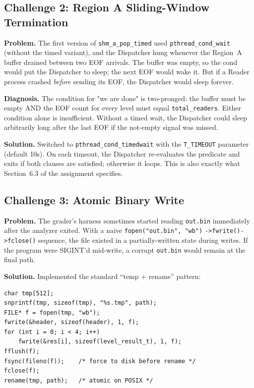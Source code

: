 \documentclass[11pt,a4paper]{article}
\newcommand{\code}[1]{\texttt{\small #1}}
\begin{document}
\subsection{Challenge 2: Region A Sliding-Window Termination}

\textbf{Problem.} The first version of \code{shm\_a\_pop\_timed} used
\code{pthread\_cond\_wait} (without the timed variant), and the
Dispatcher hung whenever the Region~A buffer drained between two EOF
arrivals. The buffer was empty, so the cond would put the Dispatcher to
sleep; the next EOF would wake it. But if a Reader process crashed
\emph{before} sending its EOF, the Dispatcher would sleep forever.

\textbf{Diagnosis.} The condition for "we are done" is two-pronged:
the buffer must be empty AND the EOF count for every level must equal
\code{total\_readers}. Either condition alone is insufficient. Without
a timed wait, the Dispatcher could sleep arbitrarily long after the
last EOF if the not-empty signal was missed.

\textbf{Solution.} Switched to \code{pthread\_cond\_timedwait} with the
\code{T\_TIMEOUT} parameter (default 10s). On each timeout, the
Dispatcher re-evaluates the predicate and exits if both clauses are
satisfied; otherwise it loops. This is also exactly what Section~6.3
of the assignment specifies.

\subsection{Challenge 3: Atomic Binary Write}

\textbf{Problem.} The grader's harness sometimes started reading
\code{out.bin} immediately after the analyzer exited. With a naive
\code{fopen("out.bin", "wb")} \code{->fwrite()->fclose()} sequence, the
file existed in a partially-written state during writes. If the
program were SIGINT'd mid-write, a corrupt \code{out.bin} would remain
at the final path.

\textbf{Solution.} Implemented the standard ``temp + rename'' pattern:

\begin{lstlisting}[style=Cstyle]
char tmp[512];
snprintf(tmp, sizeof(tmp), "%s.tmp", path);
FILE* f = fopen(tmp, "wb");
fwrite(&header, sizeof(header), 1, f);
for (int i = 0; i < 4; i++)
    fwrite(&res[i], sizeof(level_result_t), 1, f);
fflush(f);
fsync(fileno(f));    /* force to disk before rename */
fclose(f);
rename(tmp, path);   /* atomic on POSIX */
\end{lstlisting}
\end{document}
